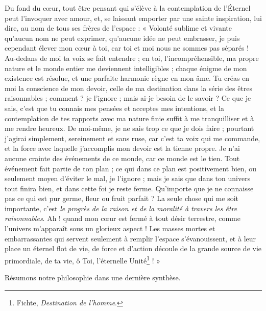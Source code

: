 \documentclass[a4paper, 11pt, oneside, landscape]{article}
\begin{document}
Du fond du cœur, tout être pensant qui s'élève à la contemplation de l'Éternel peut l'invoquer avec amour, et, se laissant emporter par une sainte inspiration, lui dire, au nom de tous ses frères de l'espace : « Volonté sublime et vivante qu'aucun nom ne peut exprimer, qu'aucune idée ne peut embrasser, je puis cependant élever mon cœur à toi, car toi et moi nous ne sommes pas séparés ! Au-dedans de moi ta voix se fait entendre ; en toi, l'incompréhensible, ma propre nature et le monde entier me deviennent intelligibles ; chaque énigme de mon existence est résolue, et une parfaite harmonie règne en mon âme. Tu créas en moi la conscience de mon devoir, celle de ma destination dans la série des êtres raisonnables ; comment ? je l'ignore ; mais ai-je besoin de le savoir ? Ce que je sais, c'est que tu connais mes pensées et acceptes mes intentions, et la contemplation de tes rapports avec ma nature finie suffit à me tranquilliser et à me rendre heureux. De moi-même, je ne sais trop ce que je dois faire ; pourtant j'agirai simplement, sereinement et sans ruse, car c'est ta voix qui me commande, et la force avec laquelle j'accomplis mon devoir est la tienne propre. Je n'ai aucune crainte des événements de ce monde, car ce monde est le tien. Tout événement fait partie de ton plan ; ce qui dans ce plan est positivement bien, ou seulement moyen d'éviter le mal, je l'ignore ; mais je sais que dans ton univers tout finira bien, et dans cette foi je reste ferme. Qu'importe que je ne connaisse pas ce qui est pur germe, fleur ou fruit parfait ? La seule chose qui me soit importante, c'est \emph{le progrès de la raison et de la moralité à travers les être raisonnables}. Ah ! quand mon cœur est fermé à tout désir terrestre, comme l'univers m'apparaît sous un glorieux aspect ! Les masses mortes et embarrassantes qui servent seulement à remplir l'espace s'évanouissent, et à leur place un éternel flot de vie, de force et d'action découle de la grande source de vie primordiale, de ta vie, ô Toi, l'éternelle Unité\footnote{Fichte, \emph{Destination de l'homme}.} ! »

Résumons notre philosophie dans une dernière synthèse.
\end{document}
